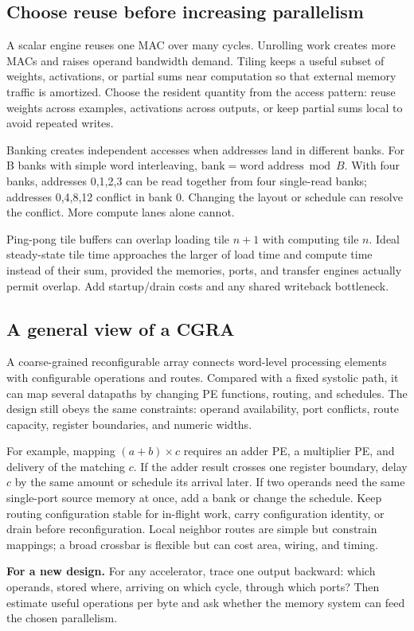 \documentclass[11pt]{article}
\newcommand{\transfer}[1]{\par\textbf{For a new design.} #1\par}
\begin{document}
\subsection{Choose reuse before increasing parallelism}
A scalar engine reuses one MAC over many cycles. Unrolling work creates more MACs and raises operand bandwidth demand.
Tiling keeps a useful subset of weights, activations, or partial sums near computation so that external memory traffic is amortized.
Choose the resident quantity from the access pattern: reuse weights across examples, activations across outputs, or keep partial sums local to avoid repeated writes.

Banking creates independent accesses when addresses land in different banks.
For B banks with simple word interleaving, \(\text{bank}=\text{word address}\bmod B\).
With four banks, addresses 0,1,2,3 can be read together from four single-read banks; addresses 0,4,8,12 conflict in bank 0.
Changing the layout or schedule can resolve the conflict. More compute lanes alone cannot.

Ping-pong tile buffers can overlap loading tile \(n+1\) with computing tile \(n\).
Ideal steady-state tile time approaches the larger of load time and compute time instead of their sum,
provided the memories, ports, and transfer engines actually permit overlap. Add startup/drain costs and any shared writeback bottleneck.

\subsection{A general view of a CGRA}
A coarse-grained reconfigurable array connects word-level processing elements with configurable operations and routes.
Compared with a fixed systolic path, it can map several datapaths by changing PE functions, routing, and schedules.
The design still obeys the same constraints: operand availability, port conflicts, route capacity, register boundaries, and numeric widths.

For example, mapping \((a+b)\times c\) requires an adder PE, a multiplier PE, and delivery of the matching \(c\).
If the adder result crosses one register boundary, delay \(c\) by the same amount or schedule its arrival later.
If two operands need the same single-port source memory at once, add a bank or change the schedule.
Keep routing configuration stable for in-flight work, carry configuration identity, or drain before reconfiguration.
Local neighbor routes are simple but constrain mappings; a broad crossbar is flexible but can cost area, wiring, and timing.
\transfer{For any accelerator, trace one output backward: which operands, stored where, arriving on which cycle, through which ports?
Then estimate useful operations per byte and ask whether the memory system can feed the chosen parallelism.}
\end{document}
